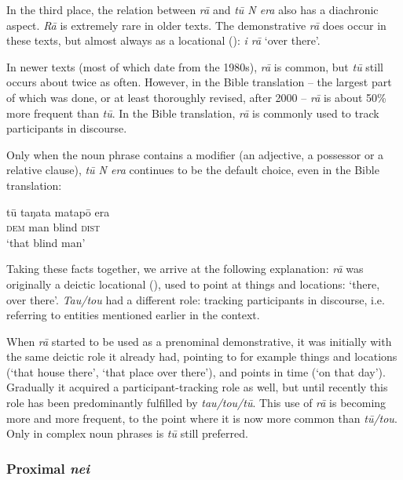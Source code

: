 In the third place, the relation between \textit{rā} and \textit{tū N era} also has a diachronic aspect. \textit{Rā} is extremely rare in older texts. The demonstrative \textit{rā} does occur in these texts, but almost always as a locational (): \textit{{\ꞌ}i rā} ‘over there’. 

In newer texts (most of which date from the 1980s), \textit{rā} is common, but \textit{tū} still occurs about twice as often. However, in the Bible translation – the largest part of which was done, or at least thoroughly revised, after 2000 – \textit{rā} is about 50\% more frequent than \textit{tū}. In the Bible translation, \textit{rā} is commonly used to track participants in discourse. 

Only when the noun phrase contains a modifier (an adjective, a possessor or a relative clause), \textit{tū N era} continues to be the default choice, even in the Bible translation:

\ea\label{ex:4.218}
\gll tū taŋata matapō era \\
\textsc{dem} man blind \textsc{dist} \\

\glt
‘that blind man’ \textstyleExampleref{[John 9:6]}
\z

Taking these facts together, we arrive at the following explanation: \textit{rā} was originally a deictic locational (), used to point at things and locations: ‘there, over there’. \textit{Tau/tou} had a different role: tracking participants in discourse, i.e. referring to entities mentioned earlier in the context. 

When \textit{rā} started to be used as a prenominal demonstrative, it was initially with the same deictic role it already had, pointing to for example things and locations (‘that house there’, ‘that place over there’), and points in time (‘on that day’). Gradually it acquired a participant-tracking role as well, but until recently this role has been predominantly fulfilled by \textit{tau/tou/tū}. This use of \textit{rā} is becoming more and more frequent, to the point where it is now more common than \textit{tū}\textit{/tou}. Only in complex noun phrases is \textit{tū} still preferred.
\subsubsection[Proximal nei]{Proximal \textit{nei}}\label{sec:4.6.4.2}


